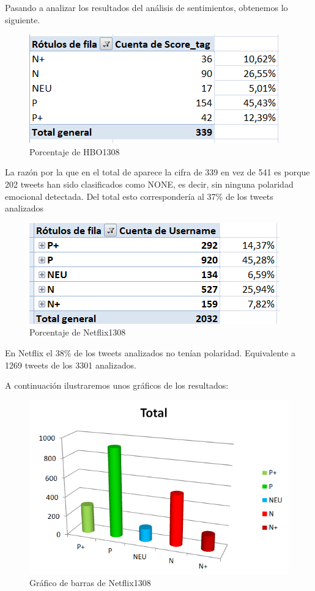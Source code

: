 Pasando a analizar los resultados del análisis de sentimientos, obtenemos lo siguiente. 

\begin{figure}[H]
	\centering
	\includegraphics[scale=1]{imagenes/porcentaje-HBO1308.PNG}
	\caption{Porcentaje de HBO1308}
	\label{fig:porcentaje-HBO1308}
\end{figure}

La razón por la que en el total de aparece la cifra de 339 en vez de 541 es porque 202 tweets han sido clasificados como NONE, es decir, sin ninguna polaridad emocional detectada. Del total esto correspondería al 37\% de los tweets analizados

\begin{figure}[H]
	\centering
	\includegraphics[scale=1]{imagenes/PorcentajesNetflix1308.PNG}
	\caption{Porcentaje de Netflix1308}
	\label{fig:porcentaje-Netflix1308}
\end{figure}


En Netflix el 38\% de los tweets analizados no tenían polaridad. Equivalente a 1269 tweets de los 3301 analizados. 

A continuación ilustraremos unos gráficos de los resultados: 

\begin{figure}[H]
	\centering
	\includegraphics[scale=1]{imagenes/GraficoBarrasNetflix1308.PNG}
	\caption{Gráfico de barras de Netflix1308}
	\label{fig:barrasNetflix1308}
\end{figure}


